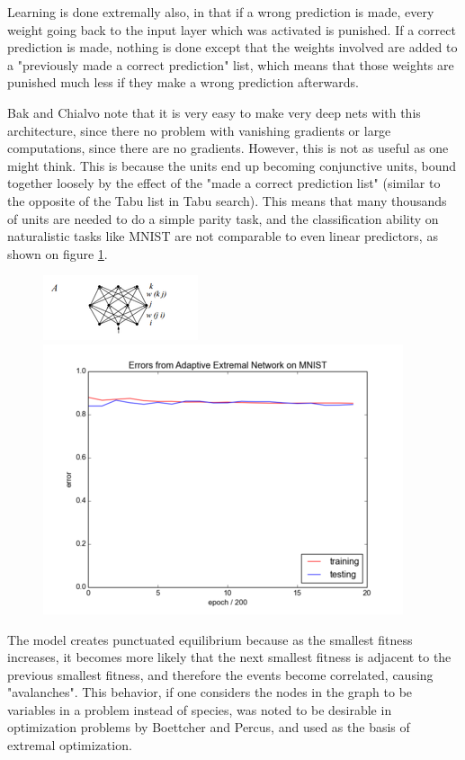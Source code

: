 \documentclass[12pt]{article}
\begin{document}
Learning is done extremally also, in that if a wrong prediction is made, every weight going back to the input layer which was activated is punished. If a correct prediction is made, nothing is done except that the weights involved are added to a "previously made a correct prediction" list, which means that those weights are punished much less if they make a wrong prediction afterwards.

Bak and Chialvo note that it is very easy to make very deep nets with this architecture, since there no problem with vanishing gradients or large computations, since there are no gradients. However, this is not as useful as one might think. This is because the units end up becoming conjunctive units, bound together loosely by the effect of the "made a correct prediction list" (similar to the opposite of the Tabu list in Tabu search). This means that many thousands of units are needed to do a simple parity task, and the classification ability on naturalistic tasks like MNIST are not comparable to even linear predictors, as shown on figure \ref{fig:baknet_res}.

\begin{figure}
  \includegraphics{bak_chialvo_net_topology}
  \includegraphics{bak_plot}
  \label{fig:baknet_res}
\end{figure}

The model creates punctuated equilibrium because as the smallest fitness increases, it becomes more likely that the next smallest fitness is adjacent to the previous smallest fitness, and therefore the events become correlated, causing "avalanches". This behavior, if one considers the nodes in the graph to be variables in a problem instead of species, was noted to be desirable in optimization problems by Boettcher and Percus, and used as the basis of extremal optimization.
\end{document}

